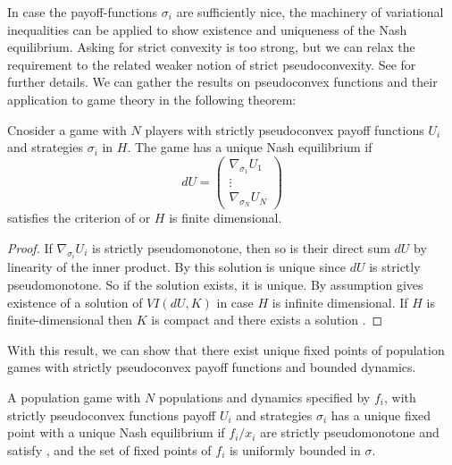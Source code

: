 In case the payoff-functions $\sigma_i$ are sufficiently nice, the machinery of variational inequalities can be applied to show existence and uniqueness of the Nash equilibrium. Asking for strict convexity is too strong, but we can relax the requirement to the related weaker notion of strict pseudoconvexity. See  for further details.
We can gather the results on pseudoconvex functions and their application to game theory in the following theorem:
\begin{theorem}
  Cnosider a game with $N$ players with strictly pseudoconvex payoff functions $U_i$ and strategies $\sigma_i$ in $H$. The game has a unique Nash equilibrium if
  \begin{equation}
    dU=
    \begin{pmatrix}
      \nabla_{\sigma_1} U_1\\
      \vdots \\
      \nabla_{\sigma_N} U_N
    \end{pmatrix}
  \end{equation}
  satisfies the criterion of  or $H$ is finite dimensional.
\end{theorem}
\begin{proof}
   If $\nabla_{\sigma_i} U_i$ is strictly pseudomonotone, then so is their direct sum $dU$ by linearity of the inner product. By  this solution is unique since $dU$ is strictly pseudomonotone. So if the solution exists, it is unique. By assumption  gives existence of a solution of $VI(dU,K)$ in case $H$ is infinite dimensional. If $H$ is finite-dimensional then $K$ is compact and there exists a solution .
\end{proof}
With this result, we can show that there exist unique fixed points of population games with strictly pseudoconvex payoff functions and bounded dynamics.
\begin{theorem}
  \label{thm:pop_game_exists_unique}
  A population game with $N$ populations and dynamics specified by $f_i$, with strictly pseudoconvex functions payoff $U_i$ and strategies $\sigma_i$ has a unique fixed point with a unique Nash equilibrium if $f_i/x_i$ are strictly pseudomonotone and satisfy , and the set of fixed points of $f_i$ is uniformly bounded in $\sigma$.
\end{theorem}
